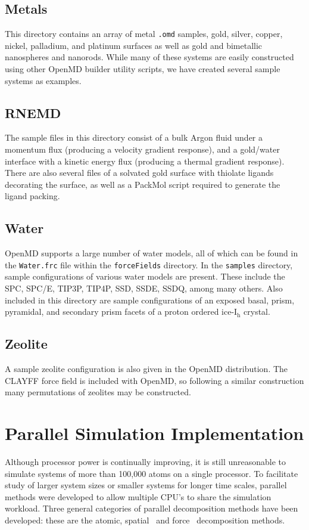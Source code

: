 \documentclass[letterpaper]{report}
\begin{document}
\section{Metals}
This directory contains an array of metal {\tt .omd} samples, gold,
silver, copper, nickel, palladium, and platinum surfaces as well as
gold and bimetallic nanospheres and nanorods. While many of these
systems are easily constructed using other OpenMD builder
utility scripts, we have created several sample systems as examples.

\section{RNEMD}
The sample files in this directory consist of a bulk Argon fluid under
a momentum flux (producing a velocity gradient response), and a
gold/water interface with a kinetic energy flux (producing a thermal
gradient response). There are also several files of a solvated gold
surface with thiolate ligands decorating the surface, as well as a
PackMol script required to generate the ligand packing.

\section{Water}
OpenMD supports a large number of water models, all of which can
be found in the {\tt Water.frc} file within the {\tt forceFields}
directory. In the {\tt samples} directory, sample configurations of
various water models are present. These include the SPC, SPC/E, TIP3P,
TIP4P, SSD, SSDE, SSDQ, among many others. Also included in this
directory are sample configurations of an exposed basal, prism,
pyramidal, and secondary prism facets of a proton ordered
ice-I$_\mathrm{h}$ crystal.

\section{Zeolite}
A sample zeolite configuration is also given in the OpenMD
distribution. The CLAYFF force field is included with OpenMD, so
following a similar construction many permutations of zeolites may be
constructed.


\chapter{\label{section:parallelization} Parallel Simulation Implementation}

Although processor power is continually improving, it is still
unreasonable to simulate systems of more than 100,000 atoms on a
single processor. To facilitate study of larger system sizes or
smaller systems for longer time scales, parallel methods were
developed to allow multiple CPU's to share the simulation
workload. Three general categories of parallel decomposition methods
have been developed: these are the atomic,\cite{Fox88}
spatial~\cite{plimpton95} and force~\cite{Paradyn} decomposition
methods.
\end{document}

